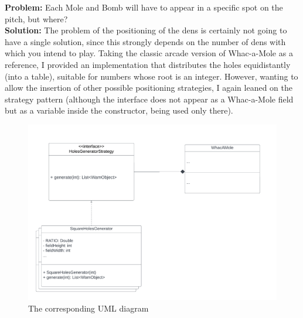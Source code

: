 \documentclass[a4paper,12pt]{report}
\begin{document}
\textbf{Problem:} Each Mole and Bomb will have to appear in a specific spot on the
pitch, but where?  \\
\textbf{Solution:} The problem of the positioning of the dens is certainly not going to have a single solution, since this strongly depends
on the number of dens with which you intend to play. Taking the classic arcade version of Whac-a-Mole as a reference, I provided an
implementation that distributes the holes equidistantly (into a table), suitable for numbers whose root is an integer. However, wanting to
allow the insertion of other possible positioning strategies, I again leaned on the strategy pattern (although the interface does not appear
as a Whac-a-Mole field but as a variable inside the constructor, being used only there).
\begin{figure}[ht]
	\centering
	\includegraphics[width=\textwidth]{res/HolesGenerator.pdf}
	\caption{The corresponding UML diagram}
\end{figure}
\pagebreak
\end{document}
